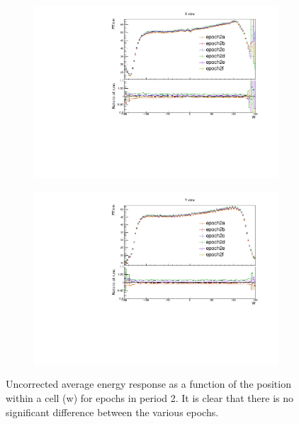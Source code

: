 \documentclass[12pt,a4paper]{article}
\begin{document}
\begin{figure}[h]
\centering
\begin{subfigure}[b]{0.495\textwidth}
\centering
\includegraphics[width=\textwidth]{Plots/Attenprofs_P2Data_WPE_corr_xy_X_Combined.pdf}
\end{subfigure}
\begin{subfigure}[b]{0.495\textwidth}
\centering
\includegraphics[width=\textwidth]{Plots/Attenprofs_P2Data_WPE_corr_xy_Y_Combined.pdf}
\end{subfigure}
\caption{Uncorrected average energy response as a function of the position within a cell (w) for epochs in period 2. It is clear that there is no significant difference between the various epochs.}
\label{figCalibhistWPE_period2}
\end{figure}
\end{document}
